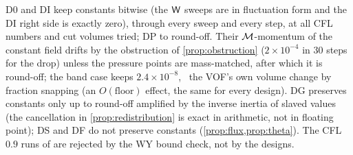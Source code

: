D0 and DI keep constants bitwise (the $\mathsf W$ sweeps are in fluctuation form and the DI right
side is exactly zero), through every sweep and every step, at all CFL numbers and cut volumes
tried; DP to round-off.  Their $\mathcal M$-momentum of the constant field drifts by the obstruction
of \cref{prop:obstruction} ($2\times10^{-4}$ in 30 steps for the drop) unless the pressure
points are mass-matched, after which it is round-off; the band case keeps $2.4\times10^{-8}$,
\infr\ the VOF's own volume change by fraction snapping (an $O(\text{floor})$ effect, the same
for every design).  DG preserves constants only up to round-off amplified by the inverse
inertia of slaved values (the cancellation in \cref{prop:redistribution} is exact in
arithmetic, not in floating point); DS and DF do not preserve constants
(\cref{prop:flux,prop:theta}).  The CFL $0.9$ runs of  are rejected by the
WY bound check, not by the designs.

